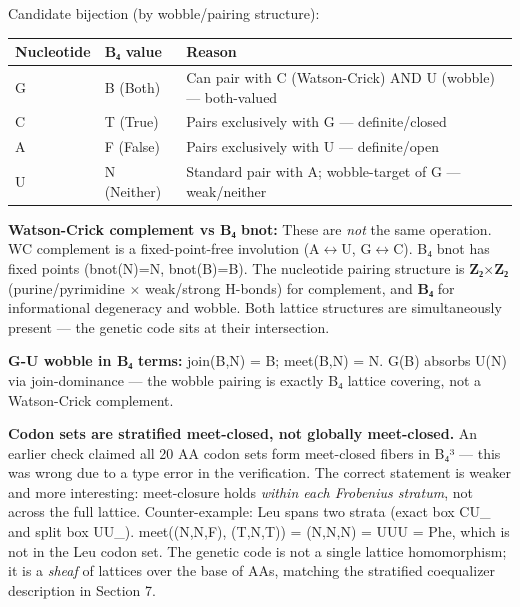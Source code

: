 \documentclass[12pt,a4paper]{article}
\begin{document}
Candidate bijection (by wobble/pairing structure):

\begin{table}[htbp]
\centering
\small
{}
\begin{tabularx}{\textwidth}{>{\centering\arraybackslash}X >{\centering\arraybackslash}X >{\centering\arraybackslash}X}
\toprule
\rowcolor{gray!25}\textbf{Nucleotide} & \textbf{B₄ value} & \textbf{Reason} \\
\midrule
\rowcolors{1}{white}{gray!10}
G & B (Both) & Can pair with C (Watson-Crick) AND U (wobble) --- both-valued \\
C & T (True) & Pairs exclusively with G --- definite/closed \\
A & F (False) & Pairs exclusively with U --- definite/open \\
U & N (Neither) & Standard pair with A; wobble-target of G --- weak/neither \\
\bottomrule
\end{tabularx}
\end{table}

\textbf{Watson-Crick complement vs B₄ bnot:} These are \emph{not} the same operation.
WC complement is a fixed-point-free involution (A$\leftrightarrow$U, G$\leftrightarrow$C). B₄ bnot has fixed points
(bnot(N)=N, bnot(B)=B). The nucleotide pairing structure is \textbf{Z₂$\times$Z₂}
(purine/pyrimidine $\times$ weak/strong H-bonds) for complement, and \textbf{B₄} for
informational degeneracy and wobble. Both lattice structures are simultaneously
present --- the genetic code sits at their intersection.

\textbf{G-U wobble in B₄ terms:} join(B,N) = B; meet(B,N) = N. G(B) absorbs U(N) via
join-dominance --- the wobble pairing is exactly B₄ lattice covering, not a
Watson-Crick complement.

\textbf{Codon sets are stratified meet-closed, not globally meet-closed.} An earlier
check claimed all 20 AA codon sets form meet-closed fibers in B₄³ --- this was
wrong due to a type error in the verification. The correct statement is weaker and
more interesting: meet-closure holds \emph{within each Frobenius stratum}, not across the
full lattice. Counter-example: Leu spans two strata (exact box CU\_ and split box
UU\_). meet((N,N,F), (T,N,T)) = (N,N,N) = UUU = Phe, which is not in the Leu
codon set. The genetic code is not a single lattice homomorphism; it is a \emph{sheaf}
of lattices over the base of AAs, matching the stratified coequalizer description
in Section 7.
\end{document}
